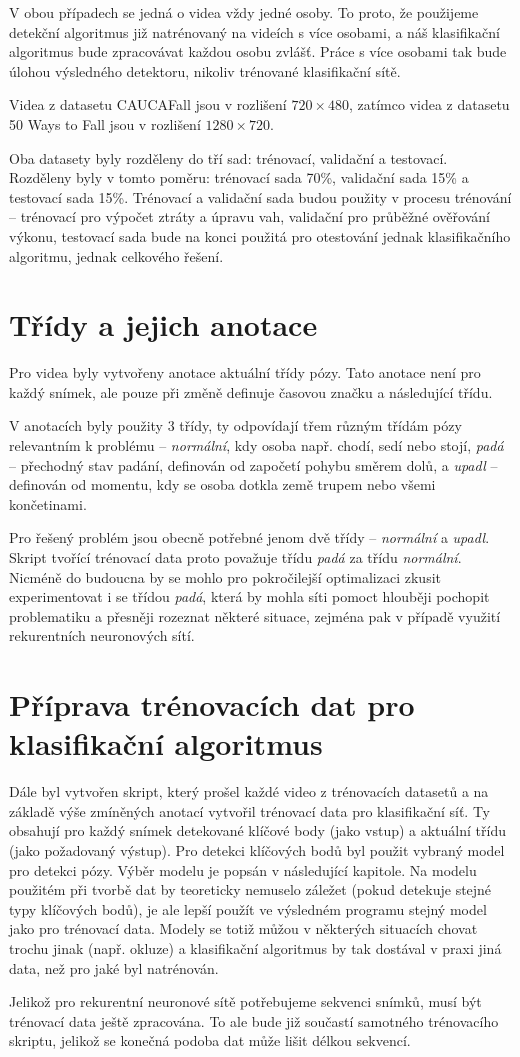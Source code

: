 V obou případech se jedná o videa vždy jedné osoby. To proto, že použijeme
detekční algoritmus již natrénovaný na videích s více osobami, a náš
klasifikační algoritmus bude zpracovávat každou osobu zvlášť. Práce s více
osobami tak bude úlohou výsledného detektoru, nikoliv trénované klasifikační
sítě.

Videa z datasetu CAUCAFall jsou v rozlišení $720\times480$, zatímco videa z
datasetu 50 Ways to Fall jsou v rozlišení $1280\times720$.

Oba datasety byly rozděleny do tří sad: trénovací, validační a testovací.
Rozděleny byly v tomto poměru: trénovací sada 70\%, validační sada 15\% a
testovací sada 15\%. Trénovací a validační sada budou použity v procesu
trénování – trénovací pro výpočet ztráty a úpravu vah, validační pro průběžné
ověřování výkonu, testovací sada bude na konci použitá pro otestování jednak
klasifikačního algoritmu, jednak celkového řešení.

\section{Třídy a jejich anotace}
Pro videa byly vytvořeny anotace aktuální třídy pózy. Tato anotace není pro
každý snímek, ale pouze při změně definuje časovou značku a následující třídu.

V anotacích byly použity 3 třídy, ty odpovídají třem různým třídám pózy
relevantním k problému – \textit{normální}, kdy osoba např. chodí, sedí nebo
stojí, \textit{padá} – přechodný stav padání, definován od započetí pohybu
směrem dolů, a \textit{upadl} – definován od momentu, kdy se osoba dotkla země
trupem nebo všemi končetinami.

Pro řešený problém jsou obecně potřebné jenom dvě třídy – \textit{normální} a
\textit{upadl}. Skript tvořící trénovací data proto považuje třídu
\textit{padá} za třídu \textit{normální}. Nicméně do budoucna by se mohlo pro
pokročilejší optimalizaci zkusit experimentovat i se třídou \textit{padá},
která by mohla síti pomoct hlouběji pochopit problematiku a přesněji rozeznat
některé situace, zejména pak v případě využití rekurentních neuronových sítí.

\section{Příprava trénovacích dat pro klasifikační algoritmus}
\label{sec:TrainingDataPrep}

Dále byl vytvořen skript, který prošel každé video z trénovacích datasetů a na
základě výše zmíněných anotací vytvořil trénovací data pro klasifikační
síť. Ty obsahují pro každý snímek detekované klíčové body (jako vstup) a
aktuální třídu (jako požadovaný výstup). Pro detekci klíčových bodů byl použit
vybraný model pro detekci pózy. Výběr modelu je popsán v následující kapitole.
Na modelu použitém při tvorbě dat by teoreticky nemuselo záležet (pokud detekuje stejné typy
klíčových bodů), je ale lepší použít ve výsledném programu stejný model jako
pro trénovací data. Modely se totiž můžou v některých situacích chovat trochu
jinak (např. okluze) a klasifikační algoritmus by tak dostával v praxi jiná data, než pro
jaké byl natrénován.

Jelikož pro rekurentní neuronové sítě potřebujeme sekvenci snímků, musí být
trénovací data ještě zpracována. To ale bude již součastí samotného trénovacího
skriptu, jelikož se konečná podoba dat může lišit délkou sekvencí.
\endinput
